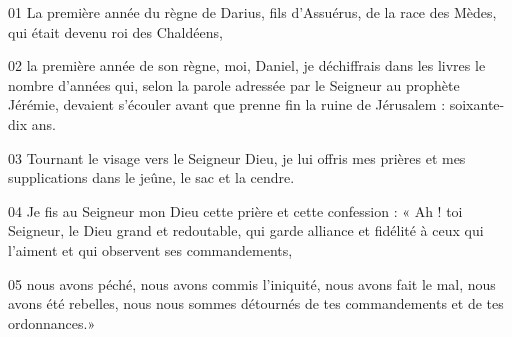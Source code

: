 01 La première année du règne de Darius, fils d’Assuérus, de la race des Mèdes, qui était devenu roi des Chaldéens,

02 la première année de son règne, moi, Daniel, je déchiffrais dans les livres le nombre d’années qui, selon la parole adressée par le Seigneur au prophète Jérémie, devaient s’écouler avant que prenne fin la ruine de Jérusalem : soixante-dix ans.

03 Tournant le visage vers le Seigneur Dieu, je lui offris mes prières et mes supplications dans le jeûne, le sac et la cendre.

04 Je fis au Seigneur mon Dieu cette prière et cette confession : « Ah ! toi Seigneur, le Dieu grand et redoutable, qui garde alliance et fidélité à ceux qui l’aiment et qui observent ses commandements,

05 nous avons péché, nous avons commis l’iniquité, nous avons fait le mal, nous avons été rebelles, nous nous sommes détournés de tes commandements et de tes ordonnances.»